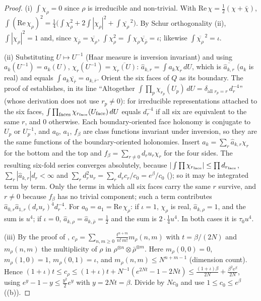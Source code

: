 \documentclass[11pt,a4paper]{article}
\theoremstyle{definition}
\theoremstyle{remark}
\newcommand{\dU}{\,dU}
\newcommand{\Fref}[3]{\cite[#1~`#2' (\texttt{#3})]{F}}
\newcommand{\Flab}[2]{\cite[#1 \texttt{#2}]{F}}
\newcommand{\IIIlab}[2]{\cite[#1 \texttt{#2}]{III}}
\begin{document}
\begin{proof}
(i) $\int\chi_\rho=0$ since $\rho$ is irreducible and non-trivial. With $\mathrm{Re}\,\chi=\frac12(\chi+\bar\chi)$,
$\int(\mathrm{Re}\,\chi_\rho)^2=\frac14\bigl(\int\chi_\rho^2+2\int|\chi_\rho|^2+\int\overline{\chi_\rho}^{\,2}\bigr)$. By Schur orthogonality
\Fref{Cited Theorem}{Haar measure, Peter--Weyl}{thm:pw}(ii), $\int|\chi_\rho|^2=1$ and, since $\chi_{\bar\rho}=\overline{\chi_\rho}$,
$\int\chi_\rho^2=\int\chi_\rho\overline{\chi_{\bar\rho}}=\iota$; likewise $\int\overline{\chi_\rho}^{\,2}=\iota$.

(ii) Substituting $U\mapsto U^{-1}$ (Haar measure is inversion invariant) and using $a_k(U^{-1})=a_k(U)$, $\chi_r(U^{-1})=\overline{\chi_r(U)}$:
$\hat a_{k,r}=\int a_k\chi_r\dU$, which is $\overline{\hat a_{k,r}}$ ($a_k$ is real) and equals $\int a_k\overline{\chi_{\bar r}}=\hat a_{k,\bar r}$.
Orient the six faces of $Q$ as its boundary. The proof of \Fref{Proposition}{Cube activity}{prop:cube} establishes, in its line
``Altogether $\int\prod_p\chi_{r_p}(U_p)\dU=\delta_{\text{all }r_p=r}\,d_r^{-4}$'' (whose derivation does not use $r_p\neq0$): for
irreducible representations attached to the six faces, $\int\prod_{\text{faces}}\chi_{r_{\rm face}}(U_{\rm face})\dU$ equals $d_r^{-4}$ if
all six are equivalent to the same $r$, and $0$ otherwise. Each boundary-oriented face holonomy is conjugate to $U_p$ or $U_p^{-1}$, and
$a_0$, $a_1$, $f_\beta$ are class functions invariant under inversion, so they are the same functions of the boundary-oriented holonomies.
Insert $a_k=\sum_r\hat a_{k,r}\chi_r$ for the bottom and the top and $f_\beta=\sum_{r\ne0}d_ru_r\chi_r$ for the four sides. The resulting
six-fold series converges absolutely, because $|\int\prod\chi_{r_{\rm face}}|\le\prod d_{r_{\rm face}}$, $\sum_r|\hat a_{k,r}|d_r<\infty$ and
$\sum_rd_r^2u_r=\sum_rd_rc_r/c_0=e^\beta/c_0$ (\Flab{eq.}{eq:trace}); so it may be integrated term by term. Only the terms in which all six faces
carry the same $r$ survive, and $r\neq0$ because $f_\beta$ has no trivial component; such a term contributes
$\hat a_{0,r}\hat a_{1,r}(d_ru_r)^4d_r^{-4}$. For $a_0=a_1=\mathrm{Re}\,\chi_\rho$: if $\iota=1$, $\chi_\rho$ is real, $\hat a_{k,\rho}=1$, and the
sum is $u^4$; if $\iota=0$, $\hat a_{k,\rho}=\hat a_{k,\bar\rho}=\frac12$ and the sum is $2\cdot\frac14u^4$. In both cases it is $\tau_0u^4$.

(iii) By the proof of \Flab{Lemma}{lem:cr}, $c_\rho=\sum_{n,m\ge0}\frac{t^{n+m}}{n!\,m!}m_\rho(n,m)$ with $t=\beta/(2N)$ and $m_\rho(n,m)$
the multiplicity of $\rho$ in $\rho^{\otimes n}\otimes\bar\rho^{\otimes m}$. Here $m_\rho(0,0)=0$, $m_\rho(1,0)=1$, $m_\rho(0,1)=\iota$, and
$m_\rho(n,m)\le N^{n+m-1}$ (dimension count). Hence $(1+\iota)t\le c_\rho\le(1+\iota)t+N^{-1}(e^{2Nt}-1-2Nt)\le\frac{(1+\iota)\beta}{2N}
+\frac{\beta^2e^\beta}{2N}$, using $e^y-1-y\le\frac{y^2}2e^y$ with $y=2Nt=\beta$. Divide by $Nc_0$ and use $1\le c_0\le e^\beta$
(\IIIlab{Lemma}{al:lem:facts}(b)).


\end{proof}
\end{document}
